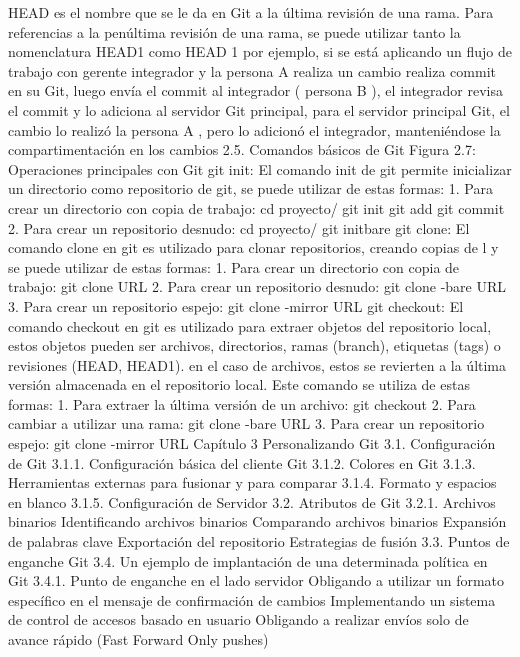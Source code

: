 \documentclass[12pt, spanish, oneside, onecolumn, a4paper]{report}
\begin{document}
HEAD es el nombre que se le da en Git a la última revisión de una rama. Para referencias a la penúltima revisión de una rama, se puede utilizar tanto la nomenclatura HEAD1 como HEAD
1 por ejemplo, si se está aplicando un flujo de trabajo con gerente integrador y la persona A realiza un cambio realiza commit en su Git, luego envía el commit al integrador ( persona B ), el integrador revisa el commit y lo adiciona al servidor Git principal, para el servidor principal Git, el cambio lo realizó la persona A , pero lo adicionó el integrador, manteniéndose la compartimentación en los cambios
 2.5. Comandos básicos de Git
Figura 2.7: Operaciones principales con Git
git init: El comando init de git permite inicializar un directorio como repositorio de git, se puede utilizar de estas formas:
1. Para crear un directorio con copia de trabajo:
 cd proyecto/
 git init
 git add
 git commit
2. Para crear un repositorio desnudo:
 cd proyecto/
 git initbare
 git clone: El comando clone en git es utilizado para clonar repositorios, creando copias de l y se puede utilizar de estas formas:
1. Para crear un directorio con copia de trabajo:
 git clone URL
2. Para crear un repositorio desnudo:
 git clone -bare URL
3. Para crear un repositorio espejo:
 git clone -mirror URL
git checkout: El comando checkout en git es utilizado para extraer objetos del repositorio local, estos objetos pueden ser archivos, directorios, ramas (branch), etiquetas (tags) o revisiones (HEAD, HEAD1). en el caso de archivos, estos se revierten a la última versión almacenada en el repositorio local. Este comando se utiliza de estas formas:
1. Para extraer la última versión de un archivo:
 git checkout
2. Para cambiar a utilizar una rama:
 git clone -bare URL
3. Para crear un repositorio espejo:
 git clone -mirror URL
Capítulo 3
Personalizando Git
3.1. Configuración de Git
3.1.1. Configuración básica del cliente Git
3.1.2. Colores en Git
3.1.3. Herramientas externas para fusionar y para comparar
3.1.4. Formato y espacios en blanco
3.1.5. Configuración de Servidor
3.2. Atributos de Git
3.2.1. Archivos binarios
Identificando archivos binarios
Comparando archivos binarios
Expansión de palabras clave
Exportación del repositorio
Estrategias de fusión
3.3. Puntos de enganche Git
3.4. Un ejemplo de implantación de una determinada política en
Git
3.4.1. Punto de enganche en el lado servidor
Obligando a utilizar un formato específico en el mensaje de confirmación de cambios
Implementando un sistema de control de accesos basado en usuario
Obligando a realizar envíos solo de avance rápido (Fast Forward Only pushes)
\end{document}
